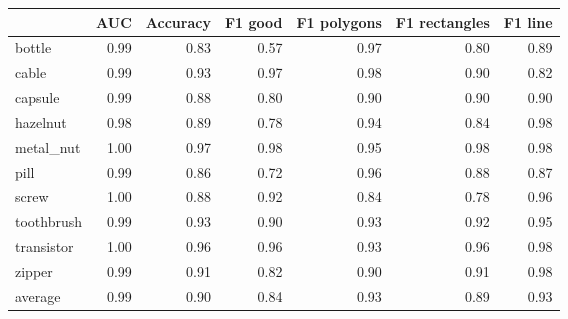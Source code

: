 \begin{tabular}{lrrrrrr}
\toprule
{} &  AUC &  Accuracy &  F1 good &  F1 polygons &  F1 rectangles &  F1 line \\
\midrule
bottle     & 0.99 &      0.83 &     0.57 &         0.97 &           0.80 &     0.89 \\
cable      & 0.99 &      0.93 &     0.97 &         0.98 &           0.90 &     0.82 \\
capsule    & 0.99 &      0.88 &     0.80 &         0.90 &           0.90 &     0.90 \\
hazelnut   & 0.98 &      0.89 &     0.78 &         0.94 &           0.84 &     0.98 \\
metal\_nut  & 1.00 &      0.97 &     0.98 &         0.95 &           0.98 &     0.98 \\
pill       & 0.99 &      0.86 &     0.72 &         0.96 &           0.88 &     0.87 \\
screw      & 1.00 &      0.88 &     0.92 &         0.84 &           0.78 &     0.96 \\
toothbrush & 0.99 &      0.93 &     0.90 &         0.93 &           0.92 &     0.95 \\
transistor & 1.00 &      0.96 &     0.96 &         0.93 &           0.96 &     0.98 \\
zipper     & 0.99 &      0.91 &     0.82 &         0.90 &           0.91 &     0.98 \\
average    & 0.99 &      0.90 &     0.84 &         0.93 &           0.89 &     0.93 \\
\bottomrule
\end{tabular}
